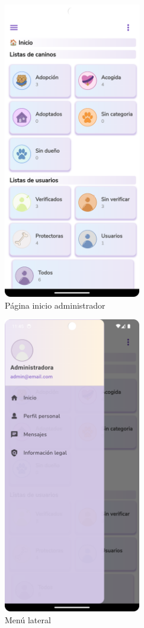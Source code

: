 \documentclass[a4paper, 12pt]{article}
\begin{document}
\begin{figure}[H]
	\begin{center}
		{\includegraphics[width=6cm]{app/AdminHome.png}\par}
		\caption{Página inicio administrador}
	\end{center}
\end{figure}

\begin{figure}[H]
	\begin{center}
		{\includegraphics[width=6cm]{app/AdminDrawer.png}\par}
		\caption{Menú lateral}
	\end{center}
\end{figure}
\end{document}
